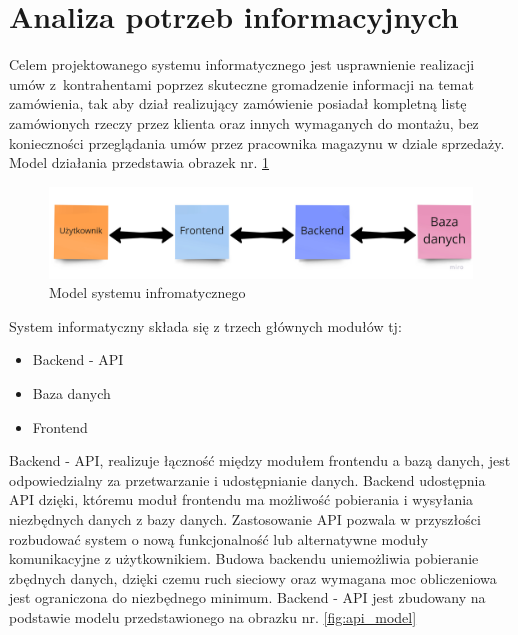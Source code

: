 \documentclass[12pt,a4paper]{article}
\begin{document}
	\section{Analiza potrzeb informacyjnych}
		\indent Celem projektowanego systemu informatycznego jest usprawnienie realizacji umów z~kontrahentami poprzez skuteczne gromadzenie informacji
			na temat zamówienia, tak aby dział realizujący zamówienie posiadał kompletną listę zamówionych rzeczy przez klienta oraz innych wymaganych do montażu, bez konieczności
			przeglądania umów przez pracownika magazynu w dziale sprzedaży. Model działania przedstawia obrazek nr. \ref{fig:sys_model}\\
			\begin{figure}[H]
			\centering
			\includegraphics[width=\textwidth]{./img/model_systemu_informatycznego.jpg}
			\caption{Model systemu infromatycznego}
			\label{fig:sys_model}
		\end{figure}
		\indent System informatyczny składa się z trzech głównych modułów tj:
			\begin{itemize}
				\item Backend - API
				\item Baza danych
				\item Frontend
			\end{itemize}
		\indent Backend - API, realizuje łączność między modułem frontendu a bazą danych, jest odpowiedzialny za przetwarzanie i udostępnianie danych. Backend udostępnia API
			dzięki, któremu	moduł frontendu ma możliwość pobierania i wysyłania niezbędnych danych z bazy danych. Zastosowanie API pozwala w przyszłości rozbudować system o nową
			funkcjonalność lub alternatywne moduły komunikacyjne z użytkownikiem. Budowa backendu uniemożliwia pobieranie zbędnych danych, dzięki czemu ruch sieciowy oraz wymagana moc
			obliczeniowa jest ograniczona do niezbędnego minimum. Backend - API jest zbudowany na podstawie modelu przedstawionego na obrazku nr. \ref{fig:api_model}\\
\end{document}
